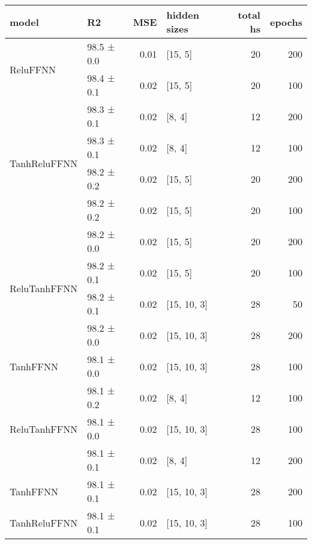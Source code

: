 \begin{longtable}{llrlrr}
\hline
 model                                      & R2          &   MSE & hidden sizes   &   total hs &   epochs \\
\hline
 \hline
\multirow{2}{*}{ReluFFNN}           & 98.5 ± 0.0  &  0.01 & [15, 5]        &         20 &      200 \\
                                            & 98.4 ± 0.1  &  0.02 & [15, 5]        &         20 &      100 \\
 \hline
\multirow{4}{*}{TanhReluFFNN}       & 98.3 ± 0.1  &  0.02 & [8, 4]         &         12 &      200 \\
                                            & 98.3 ± 0.1  &  0.02 & [8, 4]         &         12 &      100 \\
                                            & 98.2 ± 0.2  &  0.02 & [15, 5]        &         20 &      200 \\
                                            & 98.2 ± 0.2  &  0.02 & [15, 5]        &         20 &      100 \\
 \hline
\multirow{4}{*}{ReluTanhFFNN}       & 98.2 ± 0.0  &  0.02 & [15, 5]        &         20 &      200 \\
                                            & 98.2 ± 0.1  &  0.02 & [15, 5]        &         20 &      100 \\
                                            & 98.2 ± 0.1  &  0.02 & [15, 10, 3]    &         28 &       50 \\
                                            & 98.2 ± 0.0  &  0.02 & [15, 10, 3]    &         28 &      200 \\
 \hline
TanhFFNN                            & 98.1 ± 0.0  &  0.02 & [15, 10, 3]    &         28 &      100 \\
 \hline
\multirow{3}{*}{ReluTanhFFNN}       & 98.1 ± 0.2  &  0.02 & [8, 4]         &         12 &      100 \\
                                            & 98.1 ± 0.0  &  0.02 & [15, 10, 3]    &         28 &      100 \\
                                            & 98.1 ± 0.1  &  0.02 & [8, 4]         &         12 &      200 \\
 \hline
TanhFFNN                            & 98.1 ± 0.1  &  0.02 & [15, 10, 3]    &         28 &      200 \\
 \hline
TanhReluFFNN                        & 98.1 ± 0.1  &  0.02 & [15, 10, 3]    &         28 &      100 \\

\end{longtable}
